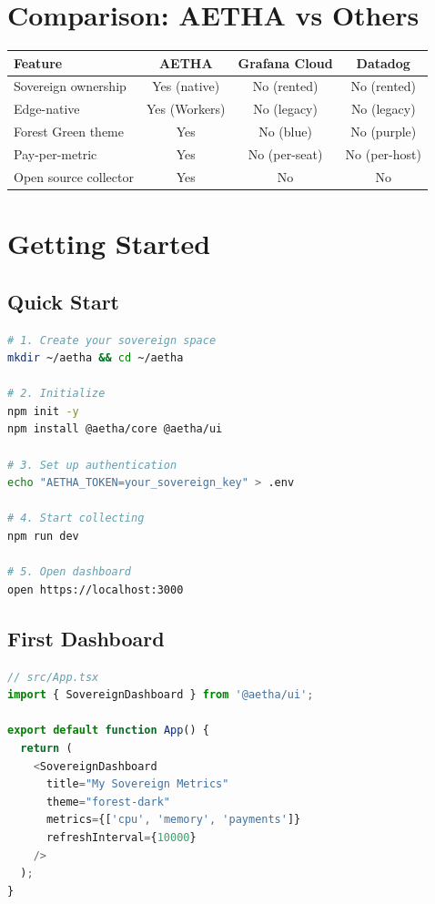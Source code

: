 \documentclass[12pt]{article}
\begin{document}
\section{Comparison: AETHA vs Others}

\begin{tabular}{|l|c|c|c|}
\hline
\textbf{Feature} & \textbf{AETHA} & \textbf{Grafana Cloud} & \textbf{Datadog} \\
\hline
Sovereign ownership & Yes (native) & No (rented) & No (rented) \\
Edge-native & Yes (Workers) & No (legacy) & No (legacy) \\
Forest Green theme & Yes & No (blue) & No (purple) \\
Pay-per-metric & Yes & No (per-seat) & No (per-host) \\
Open source collector & Yes & No & No \\
\hline
\end{tabular}

\section{Getting Started}

\subsection{Quick Start}

\begin{lstlisting}[language=bash]
# 1. Create your sovereign space
mkdir ~/aetha && cd ~/aetha

# 2. Initialize
npm init -y
npm install @aetha/core @aetha/ui

# 3. Set up authentication
echo "AETHA_TOKEN=your_sovereign_key" > .env

# 4. Start collecting
npm run dev

# 5. Open dashboard
open https://localhost:3000
\end{lstlisting}

\subsection{First Dashboard}

\begin{lstlisting}[language=typescript]
// src/App.tsx
import { SovereignDashboard } from '@aetha/ui';

export default function App() {
  return (
    <SovereignDashboard
      title="My Sovereign Metrics"
      theme="forest-dark"
      metrics={['cpu', 'memory', 'payments']}
      refreshInterval={10000}
    />
  );
}
\end{lstlisting}
\end{document}
